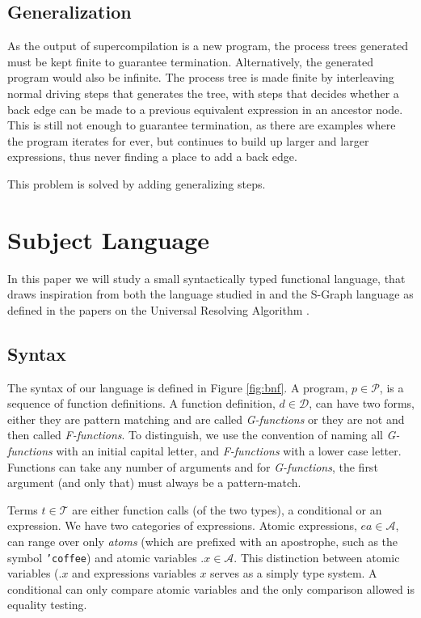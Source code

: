\documentclass[10pt]{../sigplanconf}
\begin{document}
\subsection{Generalization}
As the output of supercompilation is a new program, the process trees
generated must be kept finite to guarantee termination. Alternatively,
the generated program would also be infinite. The process tree is made
finite by interleaving normal driving steps that generates the tree,
with steps that decides whether a back edge can be made to a previous
equivalent expression in an ancestor node. This is still not enough to
guarantee termination, as there are examples where the program
iterates for ever, but continues to build up larger and larger
expressions, thus never finding a place to add a back edge.

This problem is solved by adding generalizing steps.

\section{Subject Language}
In this paper we will study a small syntactically typed functional
language, that draws inspiration from both the language studied in
\cite{sorensen1998introduction} and the S-Graph language as defined in
the papers on the Universal Resolving Algorithm
\cite{abramov2000universal, abramov2002universal,
  abramov2002principles}.

\subsection{Syntax}
The syntax of our language is defined in Figure \ref{fig:bnf}. A
program, $p \in \mathcal{P}$, is a sequence of function definitions. A
function definition, $d \in \mathcal{D}$, can have two forms, either
they are pattern matching and are called \textit{G-functions} or they
are not and then called \textit{F-functions}. To distinguish, we use
the convention of naming all \textit{G-functions} with an initial
capital letter, and \textit{F-functions} with a lower case
letter. Functions can take any number of arguments and for
\textit{G-functions}, the first argument (and only that) must always
be a pattern-match.

Terms $t \in \mathcal{T}$ are either function calls (of the two
types), a conditional or an expression. We have two categories of
expressions. Atomic expressions, $ea \in \mathcal{A}$, can range over
only \textit{atoms} (which are prefixed with an apostrophe, such as
the symbol \texttt{'coffee}) and atomic variables $\texttt{.}x \in
\mathcal{A}$. This distinction between atomic variables
($\texttt{.}x$ and expressions variables $x$ serves as a simply type
system. A conditional can only compare atomic variables and the only
comparison allowed is equality testing.
\end{document}
